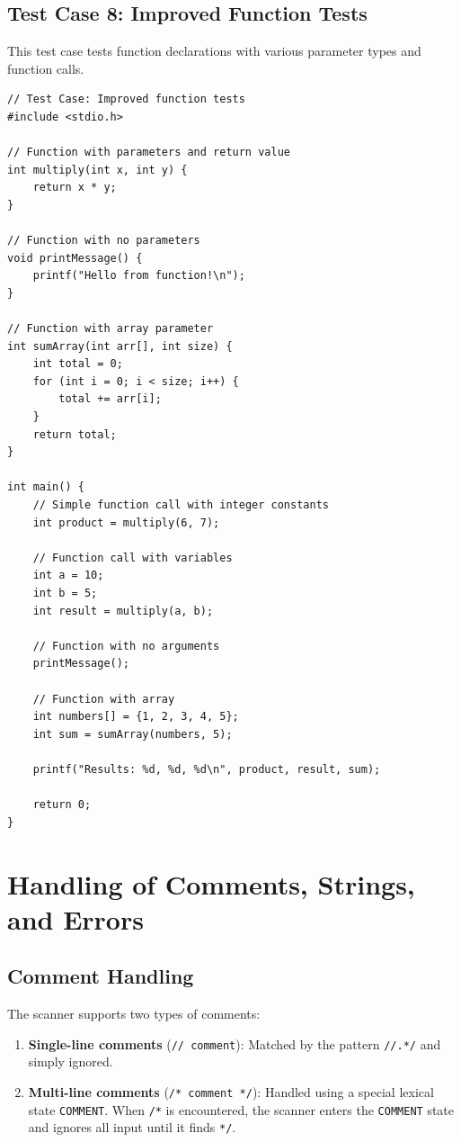 \documentclass[12pt]{article}
\begin{document}
\subsection{Test Case 8: Improved Function Tests}

This test case tests function declarations with various parameter types and function calls.

\begin{verbatim}
// Test Case: Improved function tests
#include <stdio.h>

// Function with parameters and return value
int multiply(int x, int y) {
    return x * y;
}

// Function with no parameters
void printMessage() {
    printf("Hello from function!\n");
}

// Function with array parameter
int sumArray(int arr[], int size) {
    int total = 0;
    for (int i = 0; i < size; i++) {
        total += arr[i];
    }
    return total;
}

int main() {
    // Simple function call with integer constants
    int product = multiply(6, 7);
    
    // Function call with variables
    int a = 10;
    int b = 5;
    int result = multiply(a, b);
    
    // Function with no arguments
    printMessage();
    
    // Function with array
    int numbers[] = {1, 2, 3, 4, 5};
    int sum = sumArray(numbers, 5);
    
    printf("Results: %d, %d, %d\n", product, result, sum);
    
    return 0;
}
\end{verbatim}

\section{Handling of Comments, Strings, and Errors}

\subsection{Comment Handling}

The scanner supports two types of comments:
\begin{enumerate}
    \item \textbf{Single-line comments} (\texttt{// comment}): Matched by the pattern \texttt{//.*/} and simply ignored.
    \item \textbf{Multi-line comments} (\texttt{/* comment */}): Handled using a special lexical state \texttt{COMMENT}. When \texttt{/*} is encountered, the scanner enters the \texttt{COMMENT} state and ignores all input until it finds \texttt{*/}.
\end{enumerate}
\end{document}
